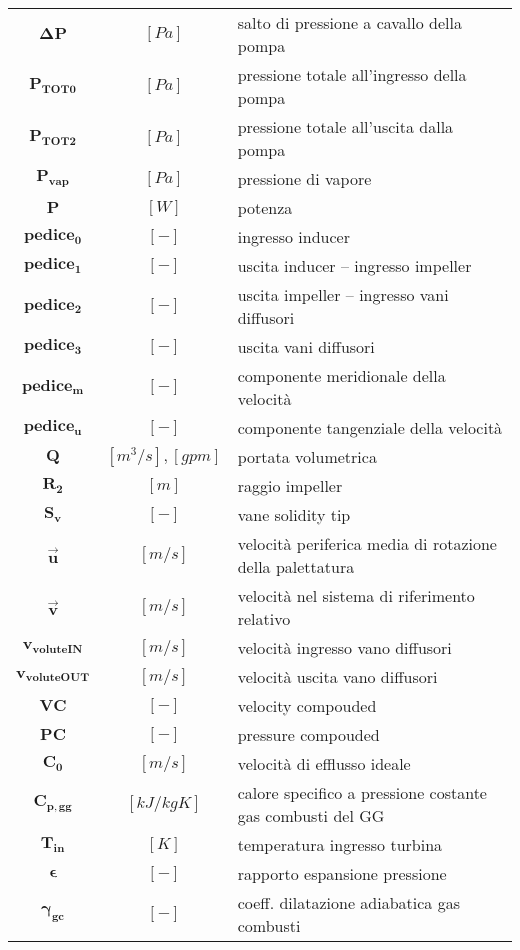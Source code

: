\begin{multicols}{2}
{\begin{xltabular}{\linewidth}{cc>{\raggedright\arraybackslash}X}
		$\bm{\Delta P}$ & $[Pa]$ & salto di pressione a cavallo della pompa \\
		$\bm{P_{TOT 0}}$ & $[Pa]$ & pressione totale all'ingresso della pompa \\
        $\bm{P_{TOT 2}}$ & $[Pa]$ & pressione totale all'uscita dalla pompa \\
	    $\bm{P_{vap}}$ & $[Pa]$ & pressione di vapore \\
		$\bm{P}$ & $[W]$ & potenza \\
		$\bm{pedice_0}$ & $[-]$ & ingresso inducer \\
        $\bm{pedice_1}$ & $[-]$ & uscita inducer – ingresso impeller \\
        $\bm{pedice_2}$ & $[-]$ & uscita impeller – ingresso vani diffusori \\
		$\bm{pedice_3}$ & $[-]$ & uscita vani diffusori \\
		$\bm{pedice_m}$ & $[-]$ & componente meridionale della velocità \\
        $\bm{pedice_u}$ & $[-]$ & componente tangenziale della velocità \\
        $\bm{Q}$ & $[m^3/s], [gpm]$ & portata volumetrica \\
		$\bm{R_2}$ & $[m]$ & raggio impeller \\
		$\bm{S_v}$ & $[-]$ & vane solidity tip \\
        $\bm{\overrightarrow{u}}$ & $[m/s]$ & velocità periferica media di rotazione della palettatura \\
        $\bm{\overrightarrow{v}}$ & $[m/s]$ & velocità nel sistema di riferimento relativo \\
		$\bm{{v_{voluteIN}}}$ & $[m/s]$ & velocità ingresso vano diffusori \\
		$\bm{{v_{voluteOUT}}}$ & $[m/s]$ & velocità uscita vano diffusori \\
		$\bm{VC}$ & $[-]$ & velocity compouded\\
		$\bm{PC}$ & $[-]$ & pressure compouded\\
		$\bm{C_0}$ & $[m/s]$ & velocità di efflusso ideale\\
		$\bm{C_{p,gg}}$ & $[kJ/kgK]$ & calore specifico a pressione costante gas combusti del GG\\
		$\bm{T_{in}}$ & $[K]$ & temperatura ingresso turbina\\
		$\bm{\epsilon}$ & $[-]$ & rapporto espansione pressione\\
		$\bm{\gamma_{gc}}$ & $[-]$ & coeff. dilatazione adiabatica gas combusti \\

\end{xltabular}}
\end{multicols}
